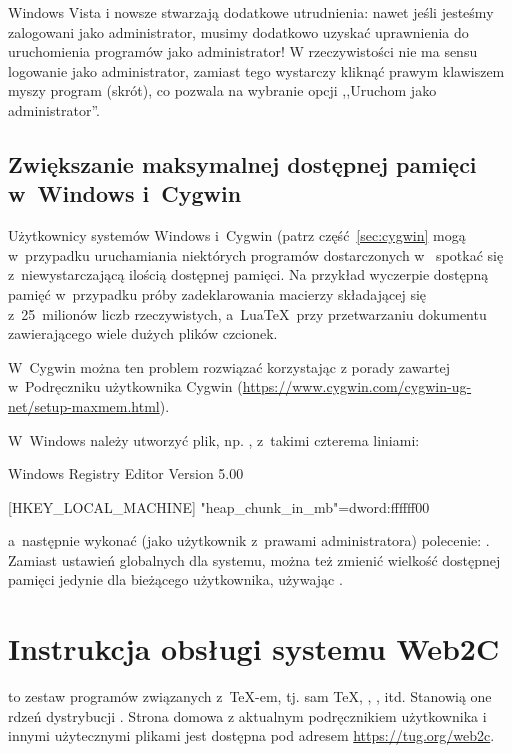 \documentclass{article}
\begin{document}
Windows Vista i nowsze stwarzają dodatkowe utrudnienia: nawet jeśli
jesteśmy zalogowani jako administrator, musimy dodatkowo uzyskać uprawnienia do
uruchomienia programów jako administrator! W rzeczywistości nie ma sensu
logowanie jako administrator, zamiast tego wystarczy kliknąć prawym klawiszem
myszy program (skrót), co pozwala na wybranie opcji ,,Uruchom jako
administrator''.


\subsection{Zwiększanie maksymalnej  dostępnej pamięci
w~Windows i~Cygwin}
\label{sec:cygwin-maxmem}

Użytkownicy systemów Windows i~Cygwin (patrz część~\ref{sec:cygwin} mogą w~przypadku uruchamiania niektórych programów dostarczonych w~\TL{} spotkać się  z~niewystarczającą
ilością dostępnej pamięci.  Na przykład  wyczerpie dostępną pamięć
w~przypadku próby zadeklarowania macierzy składającej się  z~25~milionów liczb
rzeczywistych, a~Lua\TeX\ przy przetwarzaniu dokumentu zawierającego wiele
dużych plików czcionek.

W~Cygwin można ten problem rozwiązać korzystając z porady zawartej
w~Podręczniku użytkownika Cygwin
(\url{https://www.cygwin.com/cygwin-ug-net/setup-maxmem.html}).

W~Windows należy utworzyć plik, np. , z~takimi czterema liniami:

\begin{sverbatim}
Windows Registry Editor Version 5.00

[HKEY_LOCAL_MACHINE\Software\Cygwin]
"heap_chunk_in_mb"=dword:ffffff00
\end{sverbatim}

\noindent a~następnie wykonać (jako użytkownik z~prawami administratora)
polecenie: .  Zamiast ustawień globalnych dla
systemu, można też zmienić wielkość dostępnej pamięci jedynie dla bieżącego
użytkownika, używając .


\section{Instrukcja obsługi systemu Web2C}

\Webc{} to zestaw programów związanych z~\TeX-em, tj.  sam \TeX{}, \MF{},
\MP, \BibTeX{} itd. Stanowią one rdzeń dystrybucji \TL{}. Strona domowa \Webc{} z aktualnym
podręcznikiem użytkownika i innymi użytecznymi plikami jest dostępna pod adresem \url{https://tug.org/web2c}.
\end{document}
